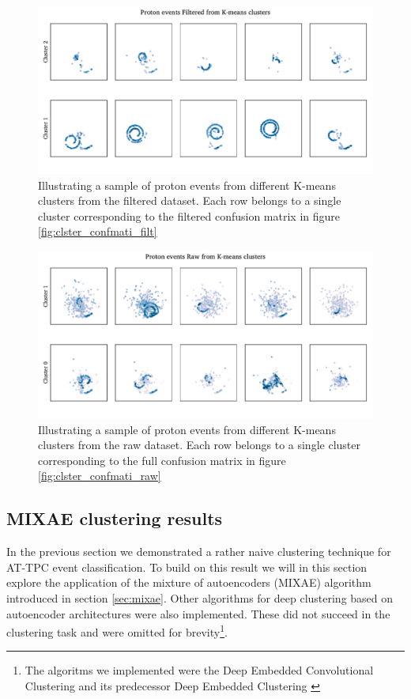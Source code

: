 \documentclass[review,number,sort&compress]{elsarticle}
\begin{document}
\begin{figure}
\includegraphics[width=\textwidth]{custom_work/Filteredexamples.pdf}
\caption[Filtered proton samples by cluster belonging]{Illustrating a sample of proton events from different K-means clusters from the filtered dataset. Each row belongs to a single cluster corresponding to the filtered confusion matrix in figure \ref{fig:clster_confmati_filt}}\label{fig:filtered_vgg_clster_repr}
\end{figure} 

\begin{figure}
\includegraphics[width=\textwidth]{custom_work/Rawexamples.pdf}
\caption[Full proton samples by cluster belonging]{Illustrating a sample of proton events from different K-means clusters from the raw dataset. Each row belongs to a single cluster corresponding to the full confusion matrix in figure \ref{fig:clster_confmati_raw}}\label{fig:full_vgg_clster_repr}
\end{figure} 


\subsection{MIXAE clustering results}

In the previous section we demonstrated a rather naive clustering technique for AT-TPC event classification. To build on this result we will in this section explore the application of the mixture of autoencoders (MIXAE) algorithm introduced in section \ref{sec:mixae}.
Other algorithms for deep clustering based on autoencoder architectures were also implemented. These did not succeed in the clustering task and were omitted for brevity\footnote{The algoritms we implemented were the Deep Embedded Convolutional Clustering \cite{Guo2017} and its predecessor Deep Embedded Clustering \cite{Xie2016}}.
\end{document}
